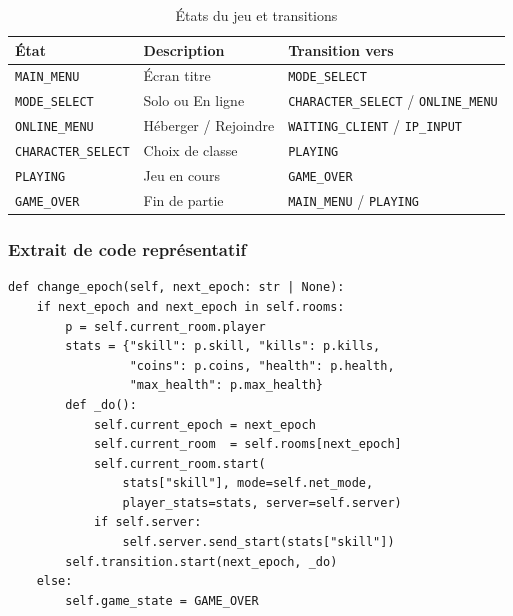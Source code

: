 \documentclass[12pt,a4paper]{article}
\begin{document}
\begin{table}[H]
\centering
\caption{États du jeu et transitions}
\renewcommand{\arraystretch}{1.35}
\begin{tabular}{@{}lll@{}}
\toprule
\rowcolor{tableheadbg}
\textbf{État} & \textbf{Description} & \textbf{Transition vers} \\
\midrule
\texttt{MAIN\_MENU}        & Écran titre          & \texttt{MODE\_SELECT} \\
\rowcolor{rowaltbg}
\texttt{MODE\_SELECT}      & Solo ou En ligne     & \texttt{CHARACTER\_SELECT} / \texttt{ONLINE\_MENU} \\
\texttt{ONLINE\_MENU}      & Héberger / Rejoindre & \texttt{WAITING\_CLIENT} / \texttt{IP\_INPUT} \\
\rowcolor{rowaltbg}
\texttt{CHARACTER\_SELECT} & Choix de classe      & \texttt{PLAYING} \\
\texttt{PLAYING}           & Jeu en cours         & \texttt{GAME\_OVER} \\
\rowcolor{rowaltbg}
\texttt{GAME\_OVER}        & Fin de partie        & \texttt{MAIN\_MENU} / \texttt{PLAYING} \\
\bottomrule
\end{tabular}
\end{table}

\subsubsection*{Extrait de code représentatif}

\begin{lstlisting}[caption={Méthode \texttt{change\_epoch()} dans \texttt{main.py} \textemdash{} transition d'époque avec persistance des stats}]
def change_epoch(self, next_epoch: str | None):
    if next_epoch and next_epoch in self.rooms:
        p = self.current_room.player
        stats = {"skill": p.skill, "kills": p.kills,
                 "coins": p.coins, "health": p.health,
                 "max_health": p.max_health}
        def _do():
            self.current_epoch = next_epoch
            self.current_room  = self.rooms[next_epoch]
            self.current_room.start(
                stats["skill"], mode=self.net_mode,
                player_stats=stats, server=self.server)
            if self.server:
                self.server.send_start(stats["skill"])
        self.transition.start(next_epoch, _do)
    else:
        self.game_state = GAME_OVER
\end{lstlisting}

\newpage
\end{document}
